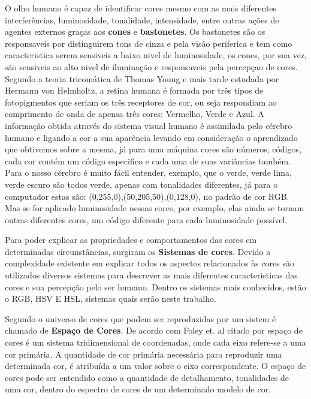 O olho humano é capaz de identificar cores mesmo com as mais diferentes interferências, luminosidade, tonalidade, intensidade, entre outras ações de agentes externos graças aos \textbf{cones} e \textbf{bastonetes}. Os bastonetes são os responsaveis por distinguirem tons de cinza e pela visão periferica e tem como caracteristica serem sensiveis a baixo nivel de luminosidade\cite{Azevedo:2003}, os cones, por sua vez, são sensiveis ao alto nivel de iluminação e responsaveis pela percepçao de cores\cite{Azevedo:2003}. Segundo a teoria tricomática de Thomas Young e mais tarde estudada por Hermann von Helmholtz\cite{Azevedo:2003}, a retina humana é formada por três tipos de fotopigmentos que seriam os três receptores de cor, ou seja respondiam ao comprimento de onda de apensa três cores: Vermelho, Verde e Azul. A informação obtida através do sistema visual humano é assimilada pelo cérebro humano e ligando a cor a sua aparência levando em consideração o aprendizado que obtivemos sobre a mesma, já para uma máquina cores são números, códigos, cada cor contém um código especifico e cada uma de suas variâncias também. Para o nosso cérebro é muito fácil entender, exemplo, que o verde, verde lima, verde escuro são todos verde, apenas com tonalidades diferentes, já para o computador estas são: (0,255,0),(50,205,50),(0,128,0), no padrão de cor RGB. Mas se for aplicado luminosidade nessas cores, por exemplo, elas ainda se tornam outras diferentes cores, um código diferente para cada luminosidade possível.




Para poder explicar as propriedades e comportamentos das cores em determinadas circunstâncias, surgiram os \textbf{Sistemas de cores}. Devido a complexidade existente em explicar todos os aspectos relacionados às cores são utilizados diversos sistemas para descrever as mais diferentes caracteristicas das cores e sua percepção pelo ser humano\cite{Azevedo:2003}.  Dentro os sistemas mais conhecidos, estão o RGB, HSV E HSL, sistemas quais serão neste trabalho.

Segundo  o universo de cores que podem ser reproduzidas por um sistem é chamado de \textbf{Espaço de Cores}. De acordo com Foley et. al citado por  espaço de cores é um sistema tridimensional de coordenadas, onde cada eixo refere-se a uma cor primária. A quantidade de cor primária
necessária para reproduzir uma determinada cor, é atribuída a um valor sobre o eixo
correspondente. O espaço de cores pode ser entendido como a quantidade de detalhamento, tonalidades de uma cor, dentro do espectro de cores de um determinado modelo de cor.

